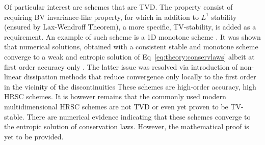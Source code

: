 Of particular interest are schemes that are \ac{TVD}. 
The property consist of requiring \ac{BV} invariance-like property, 
for which in addition to $L^1$ stability (ensured by Lax-Wendroff Theorem),
a more specific, \ac{TV}-stability, is added as a requirement. 
An example of such scheme is a 1D monotone scheme \citep{LeVeque:1992}.
It was shown that numerical solutions, obtained with a consistent stable and 
monotone scheme converge to a weak and entropic solution of Eq~\eqref{eq:theory:conservlaws}
\citep{Crandall:1980} albeit at first order accuracy only \citep{Harten:1976}.
The latter issue was resolved via introduction of non-linear dissipation methods that reduce convergence only locally to the first order in the vicinity of the discontinuities
These schemes are high-order accuracy, high \ac{HRSC} schemes.
It is however remains that the commonly used modern multidimensional \ac{HRSC} schemes are not \ac{TVD} or even yet proven to be TV-stable. There are numerical evidence indicating
that these schemes converge to the entropic solution of conservation laws. However, the mathematical proof is yet to be provided. 


